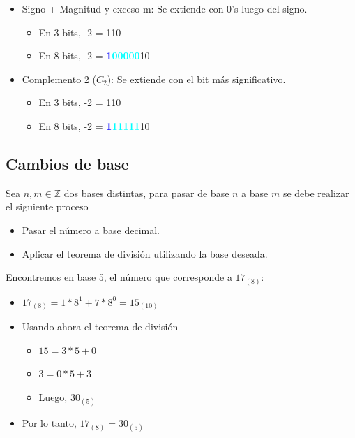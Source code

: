 \documentclass[10pt,a4paper]{article}
\begin{document}
\begin{itemize}
    \item Signo + Magnitud y exceso m: Se extiende con 0's luego del signo.
    \begin{itemize}
        \item En 3 bits, -2 = 110
        \item En 8 bits, -2 = \textcolor{blue}{\textbf{1}}\textcolor{cyan}{\textbf{00000}}10
    \end{itemize}
    \item Complemento 2 (\(C_{2}\)): Se extiende con el bit más significativo.
    \begin{itemize}
        \item En 3 bits, -2 = 110
        \item En 8 bits, -2 = \textcolor{blue}{\textbf{1}}\textcolor{cyan}{\textbf{11111}}10
    \end{itemize}
\end{itemize} 

\subsection*{Cambios de base} 
Sea \( n, m \in \mathbb{Z} \) dos bases distintas, para pasar de base \(n\) a base \(m\) se debe realizar el siguiente proceso

\begin{itemize}
    \item Pasar el número a base decimal.
    \item Aplicar el teorema de división utilizando la base deseada.
\end{itemize}

Encontremos en base 5, el número que corresponde a \(17_{(8)}\):
\begin{itemize}
    \item  \( 17_{(8)} = 1 \ast 8^{1} + 7 \ast 8^{0} = 15_{(10)} \)
    \item Usando ahora el teorema de división
    \begin{itemize}
    \item  \( 15 = 3 \ast 5 + 0 \)
    \item  \( 3 = 0 \ast 5 + 3 \)
    \item Luego, \( 30_{(5)} \)
    \end{itemize} 
    \item Por lo tanto, \( 17_{(8)} = 30_{(5)} \)
\end{itemize} 
\end{document}
